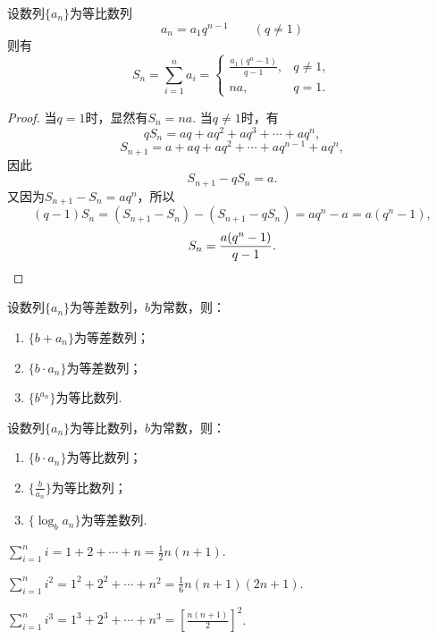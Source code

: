 \begin{property}[等比数列求和]
设数列\(\{a_n\}\)为等比数列\[
a_n = a_1 q^{n-1} \qquad (q \neq 1)
\]则有\[
S_n = \sum\limits_{i=1}^{n} a_i
= \left\{ \begin{array}{cl}
\frac{a_1 (q^n-1)}{q-1}, & q \neq 1, \\
na, & q = 1.
\end{array} \right.
\]
\begin{proof}
当\(q = 1\)时，显然有\(S_n = na\).
当\(q \neq 1\)时，有\[
q S_n = aq+aq^2+aq^3+\dotsb+aq^n,
\]\[
S_{n+1} = a+aq+aq^2+\dotsb+aq^{n-1}+aq^n,
\]因此\[
S_{n+1} - q S_n = a.
\]又因为\(S_{n+1} - S_n = aq^n\)，所以\[
(q-1) S_n = (S_{n+1} - S_n) - (S_{n+1} - q S_n) = aq^n - a = a(q^n - 1),
\]\[
S_n = \frac{a(q^n - 1)}{q-1}.
\qedhere
\]
\end{proof}
\end{property}

\begin{property}
设数列\(\{a_n\}\)为等差数列，\(b\)为常数，则：
\begin{enumerate}
\item \(\{b + a_n\}\)为等差数列；
\item \(\{b \cdot a_n\}\)为等差数列；
\item \(\{b^{a_n}\}\)为等比数列.
\end{enumerate}
\end{property}

\begin{property}
设数列\(\{a_n\}\)为等比数列，\(b\)为常数，则：
\begin{enumerate}
\item \(\{b \cdot a_n\}\)为等比数列；
\item \(\{\frac{b}{a_n}\}\)为等比数列；
\item \(\{\log_b a_n\}\)为等差数列.
\end{enumerate}
\end{property}

\begin{example}
\(\sum\limits_{i=1}^n i = 1 + 2 + \dotsb + n = \frac{1}{2} n(n+1)\).
\end{example}

\begin{example}
\(\sum\limits_{i=1}^n i^2 = 1^2 + 2^2 + \dotsb + n^2 = \frac{1}{6} n(n+1)(2n+1)\).
\end{example}

\begin{example}
\(\sum\limits_{i=1}^n i^3 = 1^3 + 2^3 + \dotsb + n^3 = \left[\frac{n(n+1)}{2}\right]^2\).
\end{example}

